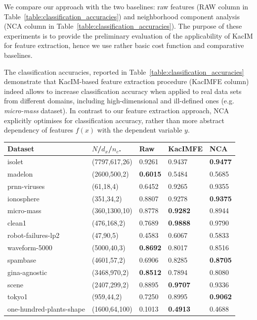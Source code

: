\documentclass{article}
\begin{document}
{We compare our approach with the two baselines: raw features (RAW column in Table~\ref{table:classification_accuracies}) and neighborhood component analysis~\cite{NIPS2004_42fe8808} (NCA column in Table~\ref{table:classification_accuracies}).  The purpose of these experiments is to provide the preliminary evaluation of the applicability of KacIM for feature extraction, hence we use rather basic cost function and comparative baselines.




The classification accuracies, reported in Table~\ref{table:classification_accuracies} demonstrate that KacIM-based feature extraction procedure (KacIMFE column) indeed allows to increase classification accuracy when applied to real data sets from different domains, including high-dimensional and ill-defined ones (e.g. \textit{micro-mass} dataset). In contrast to our feature extraction approach, NCA explicitly optimises for classification accuracy, rather than more abstract dependency of features $f(x)$ with the dependent variable $y$.



\begin{table}	
	\centering
	\begin{tabular}{ |p{3cm}|p{2.0cm}|p{1.2cm}|p{1.7cm}|p{1.2cm}|  }
		\hline
		Dataset & $N$/$d_{x}$/$n_{c}$. & Raw & KacIMFE & NCA  \\
		\hline
		isolet & (7797,617,26)   &  0.9261  &  0.9437  &  \textbf{0.9477} \\
		madelon & (2600,500,2)   &  \textbf{0.6015}  &  0.5484  &  0.5685 \\
		prnn-viruses & (61,18,4)   &  0.6452  &  0.9265  &  0.9355 \\
		ionosphere & (351,34,2)   &  0.8807  &  0.9278  &  \textbf{0.9375} \\
		micro-mass & (360,1300,10)   &  0.8778  &  \textbf{0.9282}  &  0.8944 \\
		clean1 & (476,168,2)   &  0.7689  &  \textbf{0.9888}  &  0.9790 \\
		robot-failures-lp2 & (47,90,5)   &  0.4583  &  0.6067  &  0.5833 \\
		waveform-5000 & (5000,40,3)   &  \textbf{0.8692}  &  0.8017  &  0.8516 \\
		spambase & (4601,57,2)   &  0.6906  &  0.8285  &  \textbf{0.8705} \\
		gina-agnostic & (3468,970,2)   &  \textbf{0.8512}  &  0.7894  &  0.8080 \\
		scene & (2407,299,2)   &  0.8895  &  \textbf{0.9707}  &  0.9336 \\
		tokyo1 & (959,44,2)   &  0.7250  &  0.8995  &  \textbf{0.9062} \\
		one-hundred-plants-shape & (1600,64,100)   &  0.1013  &  \textbf{0.4913}  &  0.4688 \\		
		

\end{tabular}
\end{table}}
\end{document}
